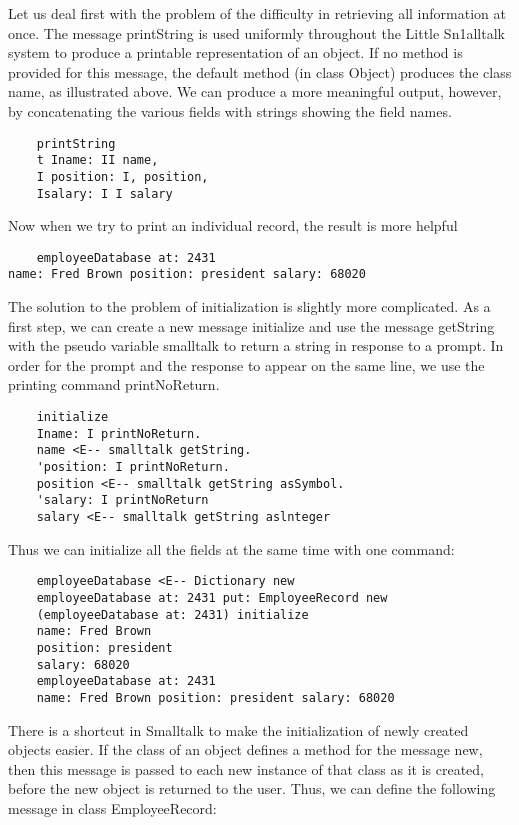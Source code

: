 Let us deal first with the problem of the difficulty in retrieving all
information at once. The message printString is used uniformly throughout
the Little Sn1alltalk system to produce a printable representation of an
object. If no method is provided for this message, the default method (in
class Object) produces the class name, as illustrated above. We can produce a more meaningful output, however, by concatenating the various
fields with strings showing the field names.

\begin{lstlisting}
    printString
    t Iname: II name,
    I position: I, position,
    Isalary: I I salary
\end{lstlisting}

Now when we try to print an individual record, the result is more helpful

\begin{lstlisting}
    employeeDatabase at: 2431
name: Fred Brown position: president salary: 68020
\end{lstlisting}

The solution to the problem of initialization is slightly more complicated. As a first step, we can create a new message initialize and use the
message getString with the pseudo variable smalltalk to return a string in
response to a prompt. In order for the prompt and the response to appear
on the same line, we use the printing command printNoReturn.

\begin{lstlisting}
    initialize
    Iname: I printNoReturn.
    name <E-- smalltalk getString.
    'position: I printNoReturn.
    position <E-- smalltalk getString asSymbol.
    'salary: I printNoReturn
    salary <E-- smalltalk getString aslnteger
\end{lstlisting}

Thus we can initialize all the fields at the same time with one command:
\begin{lstlisting}
    employeeDatabase <E-- Dictionary new
    employeeDatabase at: 2431 put: EmployeeRecord new
    (employeeDatabase at: 2431) initialize
    name: Fred Brown
    position: president
    salary: 68020
    employeeDatabase at: 2431
    name: Fred Brown position: president salary: 68020
\end{lstlisting}

There is a shortcut in Smalltalk to make the initialization of newly
created objects easier. If the class of an object defines a method for the
message new, then this message is passed to each new instance of that
class as it is created, before the new object is returned to the user. Thus,
we can define the following message in class EmployeeRecord:

